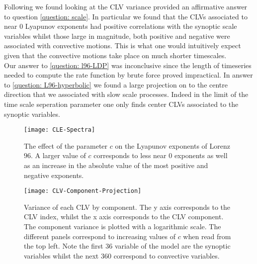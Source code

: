 Following \cite{Vannitsem2016} we found looking at the CLV variance provided an affirmative answer to question \ref{question: scale}. In particular we found that the CLVs associated to near $0$ Lyapunov exponents had positive correlations with the synoptic scale variables whilst those large in magnitude, both positive and negative were associated with convective motions. This is what one would intuitively expect given that the convective motions take place on much shorter timescales.\\

Our answer to \ref{question: l96-LDP} was inconclusive since the length of timeseries needed to compute the rate function by brute force proved impractical. In answer to \ref{question: L96-hyperbolic} we found a large projection on to the centre direction that we associated with slow scale processes. Indeed in the limit of the time scale seperation parameter one only finds center CLVs associated to the synoptic variables.



\begin{figure}
\centering
\texttt{[image: CLE-Spectra]}
\caption{The effect of the parameter $c$ on the Lyapunov exponents of Lorenz $96$. A larger value of $c$ corresponds to less near $0$ exponents as well as an increase in the absolute value of the most positive and negative exponents.}
\label{fig:c-effect-CLE}
\end{figure}

\begin{figure}
\centering
\texttt{[image: CLV-Component-Projection]}
\caption{Variance of each CLV by component. The y axis corresponds to the CLV index, whilst the x axis corresponds to the CLV component. The component variance is plotted with a logarithmic scale. The different panels correspond to increasing values of $c$ when read from the top left. Note the first $36$ variable of the model are the synoptic variables whilst the next $360$ correspond to convective variables.}
\label{fig:c-effect-projection}
\end{figure}
